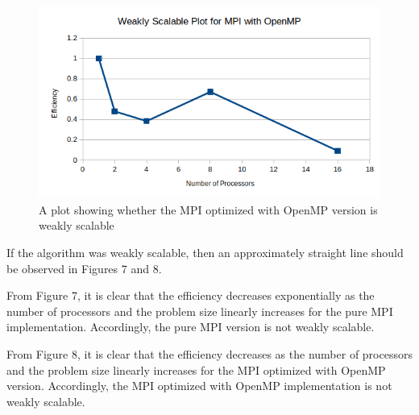 \documentclass{article}
\begin{document}
\begin{figure}[H]
	\begin{center}
		\hspace*{-0.5cm}                                                           
  		\includegraphics[scale=0.8]{Report_Assets/weakscaleomp.png}
  	\end{center}
  	\caption{A plot showing whether the MPI optimized with OpenMP version is weakly scalable}
\end{figure}

If the algorithm was weakly scalable, then an approximately straight line should be observed in Figures 7 and 8. 

From Figure 7, it is clear that the efficiency decreases exponentially as the number of processors and the problem size linearly increases for the pure MPI implementation. Accordingly, the pure MPI version is not weakly scalable.

From Figure 8, it is clear that the efficiency decreases as the number of processors and the problem size linearly increases for the MPI optimized with OpenMP version. Accordingly, the MPI optimized with OpenMP implementation is not weakly scalable.
\end{document}
